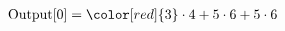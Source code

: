 \documentclass[preview]{standalone}
\begin{document}
\begin{align*}
\text{Output[0]} = \color[red]{3} \cdot 4 + 5 \cdot 6 +  5 \cdot 6
\end{align*}
\end{document}
